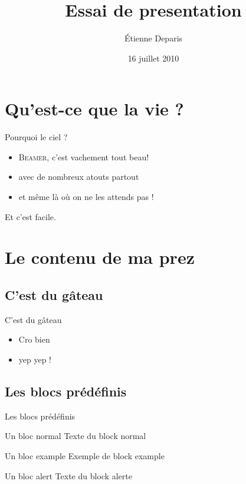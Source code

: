 \documentclass{beamer}
\title{Essai de presentation}
\author{Étienne Deparis}
\date{16 juillet 2010}
\begin{document}
\frame[plain]{\utctitlepage}

\section{Qu'est-ce que la vie ?}

\begin{frame}{Pourquoi le ciel ?}
  \begin{itemize}
  \item \textsc{Beamer}, c'est vachement tout beau!
  \item avec de nombreux atouts partout
  \item et même là où on ne les attends pas !
  \end{itemize}
\end{frame}

\begin{frame}
  Et c'est facile.
\end{frame}

\section{Le contenu de ma prez}
\subsection{C'est du gâteau}
\begin{frame}{C'est du gâteau}
  \begin{itemize}
	\item Cro bien
	\hilite<2>\item yep yep !
  \end{itemize}
\end{frame}

\subsection{Les blocs prédéfinis}
\begin{frame}{Les blocs prédéfinis}
  \begin{block}{Un bloc normal}
    Texte du block normal
  \end{block}

  \begin{exampleblock}{Un bloc example}
    Exemple de block example
  \end{exampleblock}

  \begin{alertblock}{Un bloc alert}
    Texte du block alerte
  \end{alertblock}

\end{frame}
\end{document}
